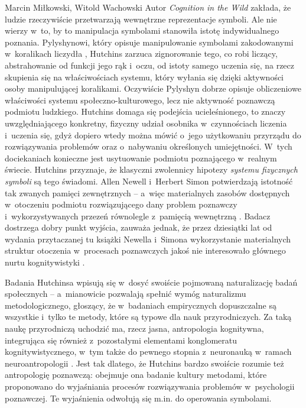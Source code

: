\begin{artplenv2auth}{Marcin Miłkowski, Witold Wachowski}
Autor \textit{Cognition in the Wild} zakłada, że ludzie rzeczywiście przetwarzają wewnętrzne reprezentacje symboli. Ale nie wierzy w~to, by to manipulacja symbolami stanowiła istotę indywidualnego poznania. Pylyshynowi, który opisuje manipulowanie symbolami zakodowanymi w~koralikach liczydła
\parencite[][s.~56]{pylyshyn_computing_1989}, %
 Hutchins zarzuca zignorowanie tego, co robi liczący, abstrahowanie od funkcji jego rąk i~oczu, od istoty samego uczenia się, na rzecz skupienia się na właściwościach systemu, który wyłania się dzięki aktywności osoby manipulującej koralikami. Oczywiście Pylyshyn dobrze opisuje obliczeniowe właściwości systemu społeczno-kulturowego, lecz nie aktywność poznawczą podmiotu ludzkiego. Hutchins domaga się podejścia ucieleśnionego, to znaczy uwzględniającego konkretny, fizyczny udział osobnika w~czynnościach liczenia i~uczenia się, gdyż dopiero wtedy można mówić o~jego użytkowaniu przyrządu do rozwiązywania problemów oraz o~nabywaniu określonych umiejętności. W~tych dociekaniach konieczne jest usytuowanie podmiotu poznającego w~realnym świecie. Hutchins przyznaje, że klasyczni zwolennicy hipotezy \textit{systemu fizycznych symboli} są tego świadomi. Allen Newell i~Herbert Simon potwierdzają istotność tak zwanych pamięci zewnętrznych -- a~więc materialnych zasobów dostępnych w~otoczeniu podmiotu rozwiązującego dany problem poznawczy i~wykorzystywanych przezeń równolegle z~pamięcią wewnętrzną 
\parencite[][s.~800–803]{newell_human_1972}. %
 Badacz dostrzega dobry punkt wyjścia, zauważa jednak, że przez dziesiątki lat od wydania przytaczanej tu książki Newella i~Simona wykorzystanie materialnych struktur otoczenia w~procesach poznawczych jakoś nie interesowało głównego nurtu kognitywistyki 
\parencites[][]{dahlback_perspective_2016}[][s.~364–370]{hutchins_cognition_1995}.%


Badania Hutchinsa wpisują się w~dosyć swoiście pojmowaną naturalizację badań społecznych -- a~mianowicie pozwalają spełnić wymóg naturalizmu metodologicznego, głoszący, że w~badaniach empirycznych
dopuszczalne są wszystkie i~tylko te metody, które są typowe dla nauk przyrodniczych. Za taką naukę przyrodniczą uchodzić ma, rzecz jasna, antropologia kognitywna, integrująca się również z~pozostałymi elementami konglomeratu kognitywistycznego, w~tym także do pewnego stopnia z~neuronauką w~ramach neuroantropologii
\parencite[][]{lende_encultured_2012}. %
 Jest tak dlatego, że Hutchins bardzo swoiście rozumie też antropologię poznawczą: obejmuje ona badanie kultury metodami, które proponowano do wyjaśniania procesów rozwiązywania problemów w~psychologii poznawczej. Te wyjaśnienia odwołują się m.in. do operowania symbolami.


\end{artplenv2auth}
